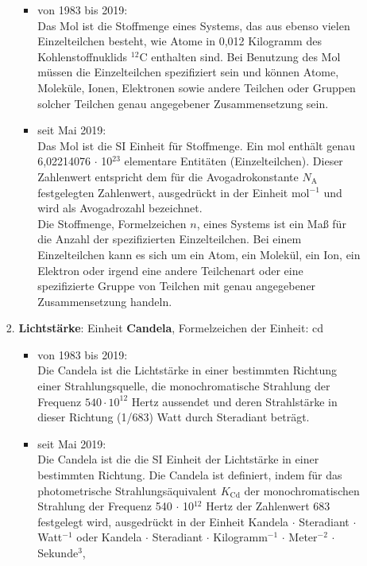 \begin{raggedright}
\begin{enumerate}
\begin{itemize}
\begin{enumerate}[1.)]
			\begin{itemize}
			\item von 1983 bis 2019:\\
			Das Mol ist die Stoffmenge eines Systems, das aus ebenso vielen
			Einzelteilchen besteht, wie Atome in 0,012 Kilogramm des
			Kohlenstoffnuklids $^{12}\mathrm{C}$ enthalten sind. Bei Benutzung des Mol
			müssen die Einzelteilchen spezifiziert sein und können Atome, Moleküle,
			Ionen, Elektronen sowie andere Teilchen oder Gruppen solcher
			Teilchen genau angegebener Zusammensetzung sein.
			\item seit Mai 2019:\\
      Das Mol ist die SI Einheit für Stoffmenge. Ein mol
      enthält genau 6,02214076 $\cdot$ 10$^{23}$ elementare Entitäten (Einzelteilchen).
      Dieser Zahlenwert entspricht dem für die Avogadrokonstante
      $N_\mathrm{A}$ festgelegten Zahlenwert, ausgedrückt in der Einheit mol$^{-1}$
      und wird als Avogadrozahl bezeichnet.\\
      Die Stoffmenge, Formelzeichen $n$, eines Systems ist ein Maß für die Anzahl der
      spezifizierten Einzelteilchen. Bei einem Einzelteilchen kann es sich um ein Atom, ein Molekül,
      ein Ion, ein Elektron oder irgend eine andere Teilchenart oder eine spezifizierte Gruppe
      von Teilchen mit genau angegebener Zusammensetzung handeln.\\
			\end{itemize}
		\item \textbf{Lichtstärke}: Einheit \textbf{Candela}, Formelzeichen der Einheit: cd
			\begin{itemize}
			\item von 1983 bis 2019:\\
			Die Candela ist die Lichtstärke in einer bestimmten Richtung
			einer Strahlungsquelle, die monochromatische Strahlung der
			Frequenz $540 \cdot 10^{12}$ Hertz aussendet und deren Strahlstärke in
			dieser Richtung (1/683) Watt durch Steradiant beträgt.
			\item seit Mai 2019:\\
      Die Candela ist die die SI Einheit der Lichtstärke in einer bestimmten Richtung. 
      Die Candela ist definiert, indem für das photometrische Strahlungsäquivalent
      $K_\mathrm{Cd}$ der monochromatischen Strahlung der
      Frequenz 540 $\cdot$ 10$^{12}$ Hertz der Zahlenwert 683 festgelegt wird,
      ausgedrückt in der Einheit Kandela $\cdot$ Steradiant $\cdot$ Watt$^{-1}$
      oder Kandela $\cdot$ Steradiant $\cdot$ Kilogramm$^{-1}$ $\cdot$ Meter$^{-2}$ $\cdot$ Sekunde$^3$,

\end{itemize}
\end{enumerate}
\end{itemize}
\end{enumerate}
\end{raggedright}
